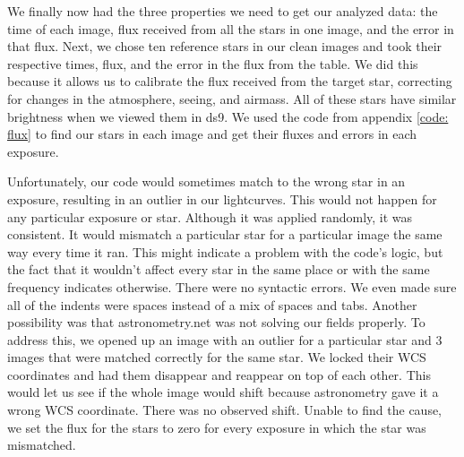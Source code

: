 \documentclass{aastex61}
\begin{document}
We finally now had the three properties we need to get our analyzed data: the time of each image, flux received from all the stars in one image, and the error in that flux. Next, we chose ten reference stars in our clean images and took their respective times, flux, and the error in the flux from the table. We did this because it allows us to calibrate the flux received from the target star, correcting for changes in the atmosphere, seeing, and airmass. All of these stars have similar brightness when we viewed them in ds9. We used the code from appendix \ref{code: flux} to find our stars in each image and get their fluxes and errors in each exposure. 

Unfortunately, our code would sometimes match to the wrong star in an exposure, resulting in an outlier in our lightcurves. This would not happen for any particular exposure or star. Although it was applied randomly, it was consistent. It would mismatch a particular star for a particular image the same way every time it ran. This might indicate a problem with the code's logic, but the fact that it wouldn't affect every star in the same place or with the same frequency indicates otherwise. There were no syntactic errors. We even made sure all of the indents were spaces instead of a mix of spaces and tabs. Another possibility was that astronometry.net was not solving our fields properly. To address this, we opened up an image with an outlier for a particular star and 3 images that were matched correctly for the same star. We locked their WCS coordinates and had them disappear and reappear on top of each other. This would let us see if the whole image would shift because astronometry gave it a wrong WCS coordinate. There was no observed shift. Unable to find the cause, we set the flux for the stars to zero for every exposure in which the star was mismatched. 
\end{document}
